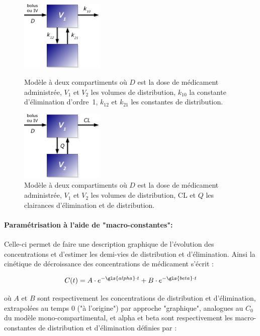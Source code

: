 \begin{figure}[h!]
        \centering \includegraphics[width=4cm]{figures/raster/FIG_4}
        \caption[Modèle à deux compartiments (micro constantes]{Modèle à deux compartiments où $D$ est la dose de médicament administrée, $V_1$ et $V_2$ les volumes de distribution, $k_{10}$ la constante d'élimination d'ordre~1, $k_{12}$ et $k_{21}$ les constantes de distribution.}
	\label{fig:4}
        \centering \includegraphics[width=4cm]{figures/raster/FIG_5}
        \caption[Modèle à deux compartiments (constantes "physiologiques")]{Modèle à deux compartiments où $D$ est la dose de médicament administrée, $V_1$ et $V_2$ les volumes de distribution, \gls{CL} et $Q$ les clairances d'élimination et de distribution.}
	\label{fig:5}
\end{figure}

\paragraph*{Paramétrisation à l'aide de "macro-constantes":} Celle-ci permet de faire une description graphique de l'évolution des concentrations et d'estimer les demi-vies de distribution et d'élimination. Ainsi la cinétique de décroissance des concentrations de médicament s'écrit :

\begin{equation}
C(t) = A \cdot e^{-\gls{alpha}\cdot t}+B \cdot e^{-\gls{beta}\cdot t}
\label{eq:28}
\end{equation}

où $A$ et $B$ sont respectivement les concentrations de distribution et d'élimination, extrapolées au temps $0$ ("à l'origine") par approche "graphique", analogues au $C_0$ du modèle mono-compartimental, et \gls{alpha} et \gls{beta} sont respectivement les macro-constantes de distribution et d'élimination définies par :

